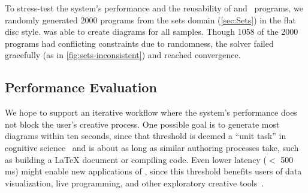 To stress-test the system's performance and the reusability of \Style{} and \Domain{}\ programs, we randomly generated 2000 \Substance{} programs from the sets domain (\cref{sec:Sets}) in the flat disc style. \Penrose{} was able to create diagrams for all samples. Though 1058 of the 2000 programs had conflicting constraints due to randomness, the solver failed gracefully (as in \cref{fig:sets-inconsistent}) and reached convergence.

\subsection{Performance Evaluation}
\label{sec:PerformanceEvaluation}

We hope to support an iterative workflow where the system's performance does not block the user's creative process. One possible goal is to generate most diagrams within ten seconds, since that threshold is deemed a ``unit task'' in cognitive science~\cite{unifiedTheoriesCognition} and is about as long as similar authoring processes take, such as building a \LaTeX{} document or compiling code. Even lower latency ($<$ 500 ms) might enable new applications of \Penrose, since this threshold benefits users of data visualization, live programming, and other exploratory creative tools~\cite{Liu:latency:2014}.

